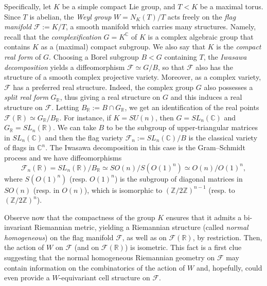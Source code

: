 \documentclass[11pt,twoside]{amsart}
\theoremstyle{plain}
\newcommand{\C}{{\mathbb C}}
\newcommand{\R}{{\mathbb R}}
\newcommand{\Z}{{\mathbb Z}}
\begin{document}
Specifically, let $K$ be a simple compact Lie group, and $T<K$ be a maximal torus. Since $T$ is abelian, the \textit{Weyl group} $W=N_K(T)/T$ acts freely on the \textit{flag manifold} $\mathcal{F}:=K/T$, a smooth manifold which carries many structures. Namely, recall that the \textit{complexification} $G=K^\C$ of $K$ is a complex algebraic group that contains $K$ as a (maximal) compact subgroup. We also say that $K$ is the \textit{compact real form} of $G$. Choosing a Borel subgroup $B<G$ containing $T$, the \textit{Iwasawa decomposition} yields a diffeomorphism $\mathcal{F}\simeq G/B$, so that $\mathcal{F}$ also has the structure of a smooth complex projective variety. Moreover, as a complex variety, $\mathcal{F}$ has a preferred real structure. Indeed, the complex group $G$ also possesses a \textit{split real form} $G_\R$, thus giving a real structure on $G$ and this induces a real structure on $\mathcal{F}$. Letting $B_\R:=B\cap G_\R$, we get an identification of the real points $\mathcal{F}(\R)\simeq G_\R/B_\R$. For instance, if $K=SU(n)$, then $G=SL_n(\C)$ and $G_\R=SL_n(\R)$. We can take $B$ to be the subgroup of upper-triangular matrices in $SL_n(\C)$ and then the flag variety $\mathcal{F}_n:=SL_n(\C)/B$ is the classical variety of flags in $\C^n$. The Iwasawa decomposition in this case is the Gram--Schmidt process and we have diffeomorphisms
\[\mathcal{F}_n(\R)=SL_n(\R)/B_\R\simeq SO(n)/S(O(1)^n)\simeq O(n)/O(1)^n,\]
where $S(O(1)^n)$ (resp. $O(1)^n$) is the subgroup of diagonal matrices in $SO(n)$ (resp. in $O(n)$), which is isomorphic to $(\Z/2\Z)^{n-1}$ (resp. to $(\Z/2\Z)^n$).

Observe now that the compactness of the group $K$ ensures that it admits a bi-invariant Riemannian metric, yielding a Riemannian structure (called \textit{normal homogeneous}) on the flag manifold $\mathcal{F}$, as well as on $\mathcal{F}(\R)$, by restriction. Then, the action of $W$ on $\mathcal{F}$ (and on $\mathcal{F}(\R)$) is isometric. This fact is a first clue suggesting that the normal homogeneous Riemannian geometry on $\mathcal{F}$ may contain information on the combinatorics of the action of $W$ and, hopefully, could even provide a $W$-equivariant cell structure on $\mathcal{F}$.
\end{document}
